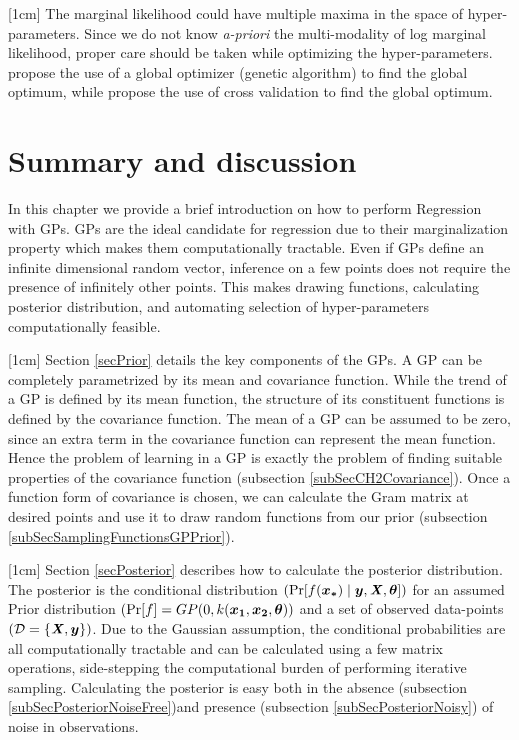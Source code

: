 [1cm]
The marginal likelihood could have multiple maxima in the space of hyper-parameters. Since we do not know \textit{a-priori} the multi-modality of log marginal likelihood, proper care should be taken while optimizing the hyper-parameters. \cite{forrester2008engineering} propose the use of a global optimizer (genetic algorithm) to find the global optimum, while \cite{le2013multi, bouhlel2016optimisation} propose the use of cross validation to find the global optimum.

\section{Summary and discussion}\label{secCH2Discussion}
In this chapter we provide a brief introduction on how to perform Regression with GPs. GPs are the ideal candidate for regression due to their marginalization property which makes them computationally tractable. Even if GPs define an infinite dimensional random vector, inference on a few points does not require the presence of infinitely other points. This makes drawing functions, calculating posterior distribution, and automating selection of hyper-parameters computationally feasible.  

[1cm]
Section \ref{secPrior} details the key components of the GPs. A GP can be completely parametrized by its mean and covariance function. While the trend of a GP is defined by its mean function, the structure of its constituent functions is defined by the covariance function. The mean of a GP can be assumed to be zero, since an extra term in the covariance function can represent the mean function. Hence the problem of learning in a GP is exactly the problem of finding suitable properties of the covariance function (subsection \ref{subSecCH2Covariance}). Once a function form of covariance is chosen, we can calculate the Gram matrix at desired points and use it to draw random functions from our prior (subsection \ref{subSecSamplingFunctionsGPPrior}). 

[1cm]
Section \ref{secPosterior} describes how to calculate the posterior distribution. The posterior is the conditional distribution $(\Pr[f(\boldsymbol{x_{*}}) \mid \boldsymbol{y}, \bm{\mathit{X}}, \boldsymbol{\theta}])$ for an assumed Prior distribution $(\Pr[f] = GP(0, k(\boldsymbol{x_1}, \boldsymbol{x_2}, \boldsymbol{\theta}))$ and a set of observed data-points $(\mathcal{D} = \{\bm{\mathit{X}}, \boldsymbol{y}\})$. Due to the Gaussian assumption, the conditional probabilities are all computationally tractable and can be calculated using a few matrix operations, side-stepping the computational burden of performing iterative sampling. Calculating the posterior is easy both in the absence (subsection \ref{subSecPosteriorNoiseFree})and presence (subsection \ref{subSecPosteriorNoisy}) of noise in observations. 


